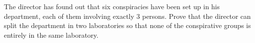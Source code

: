 The director has found out that six conspiracies have been set up in his department, each of them involving exactly $3$ persons. Prove that the director can split the department in two laboratories so that none of the conspirative groups is entirely in the same laboratory.